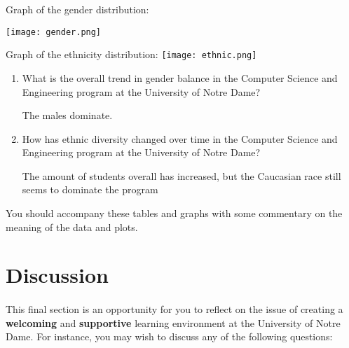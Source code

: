 \documentclass[letterpaper]{article}
\begin{document}
Graph of the gender distribution: 

\texttt{[image: gender.png]}

Graph of the ethnicity distribution:
\texttt{[image: ethnic.png]}


\begin{enumerate}

\item{}What is the overall trend in gender balance in the Computer Science and
    Engineering program at the University of Notre Dame?

The males dominate.

\item{}How has ethnic diversity changed over time in the Computer Science and
    Engineering program at the University of Notre Dame?

The amount of students overall has increased, but the Caucasian race still seems
to dominate the program

\end{enumerate}


You should accompany these tables and graphs with some commentary on the
meaning of the data and plots.

\paragraph{}


\section*{Discussion}

\paragraph{}

This final section is an opportunity for you to reflect on the issue of
creating a {\bf welcoming} and {\bf supportive} learning environment at the
University of Notre Dame. For instance, you may wish to discuss any of the
following questions:
\end{document}

